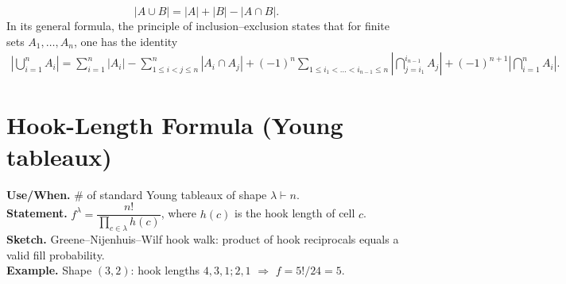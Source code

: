 \documentclass[11pt,A4,twoside]{article}
\let\oldsection\section
\renewcommand{\section}{\FloatBarrier\oldsection}
\numberwithin{equation}{section}
\theoremstyle{definition}
\theoremstyle{remark}
\newcommand\bal{\begin{aligned}}
\newcommand\eal{\end{aligned}}
\newcommand{\beql}[1]{\begin{equation}\label{#1}\bal}
\newcommand{\eeql}{\eal\end{equation}}
\begin{document}
\[
|A\cup B| = |A|+|B|-|A\cap B|.
\]
In its general formula, the principle of inclusion–exclusion states that for finite sets $A_1, \dots, A_n$, one has the identity
\beql{}
\left|\bigcup_{i=1}^n A_i\right|=\sum_{i=1}^n|A_i|-\sum_{1\leq i< j \leq  n}^n\left|A_i\cap A_j\right|+(-1)^{n}\sum_{1 \leq i_1 < \dots  < i_{n-1} \leq n}\left|\bigcap_{j=i_{1}}^{i_{n-1}} A_j\right| + (-1)^{n+1}\left|\bigcap_{i=1}^n A_i\right|.
\eeql

\section{Hook-Length Formula (Young tableaux)}
\textbf{Use/When.} \# of standard Young tableaux of shape \(\lambda\vdash n\).\\
\textbf{Statement.} \(f^\lambda=\dfrac{n!}{\prod_{c\in \lambda} h(c)}\), where \(h(c)\) is the hook length of cell \(c\).\\
\textbf{Sketch.} Greene–Nijenhuis–Wilf hook walk: product of hook reciprocals equals a valid fill probability.\\
\textbf{Example.} Shape \((3,2)\): hook lengths \(4,3,1;2,1\) \(\Rightarrow\) \(f=5!/24=5\).
\end{document}
